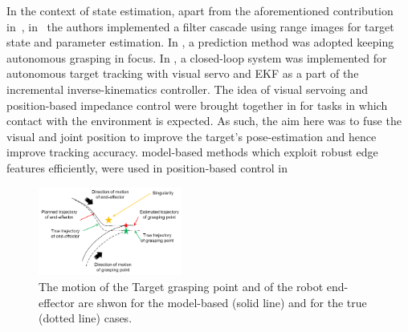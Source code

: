 In the context of state estimation, apart from the aforementioned contribution in~\cite{aghili2012prediction}, in~\cite{Dubowsky} the authors implemented a filter cascade using range images for target state and parameter estimation. In \cite{hillenbrand2005motion}, a prediction method was adopted keeping autonomous grasping in focus. In \cite{RIS0}, a closed-loop system was implemented for autonomous target tracking with visual servo and EKF as a part of the incremental inverse-kinematics controller. The idea of visual servoing and position-based impedance control were brought together in \cite{Lippiello} for tasks in which contact with the environment is expected. As such, the aim here was to fuse the visual and joint position to improve the target's pose-estimation and hence improve tracking accuracy.  model-based methods 
which exploit robust edge features efficiently, were used in position-based control in~\cite{Drummond2002}  

%
%
%
%
%
\begin{figure}[t!]
\centering\includegraphics[angle=0,width=0.42\textwidth]{./figures/Motivation_Image}
\caption{The motion of the Target grasping point and of the robot end-effector are shwon for the model-based (solid line) and for the true (dotted line) cases.}
\label{fig:motivation}
\end{figure}
%
